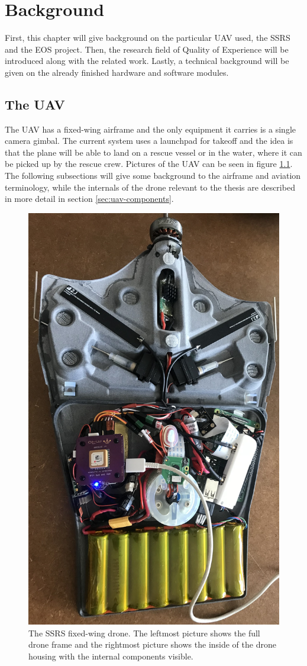 \documentclass[nofilelist]{cslthse-msc}
\begin{document}
\chapter{Background}
First, this chapter will give background on the particular UAV used, the SSRS and the EOS project. Then, the research field of Quality of Experience will be introduced along with the related work. Lastly, a technical background will be given on the already finished hardware and software modules.  

\section{The UAV}
\label{sec:fixed-wing-uav}
The UAV has a fixed-wing airframe and the only equipment it carries is a single camera gimbal. The current system uses a launchpad for takeoff and the idea is that the plane will be able to land on a rescue vessel or in the water, where it can be picked up by the rescue crew. Pictures of the UAV can be seen in figure \ref{fig:fv-drone-pics}. The following subsections will give some background to the airframe and aviation terminology, while the internals of the drone relevant to the thesis are described in more detail in section \ref{sec:uav-components}.

\begin{figure}[htp]
   \centering
   \includegraphics[width=.35\textwidth]{images/fv-1.jpg}
   \caption{The SSRS fixed-wing drone. The leftmost picture shows the full drone frame and the rightmost picture shows the inside of the drone housing with the internal components visible.}
   \label{fig:fv-drone-pics}
\end{figure}
\end{document}

